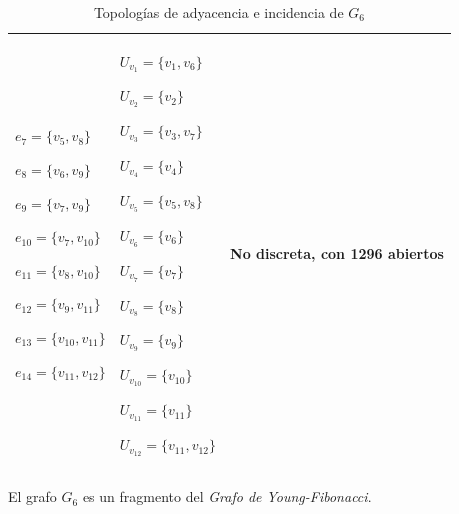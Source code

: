 \begin{table}[p]
\begin{tabular}{@{}>{\centering\arraybackslash}m{}>{\centering\arraybackslash}m{}>{\centering\arraybackslash}m{}@{}}
         ${e_{7}=\{v_5,v_8\}}$\par
         ${e_{8}=\{v_6,v_9\}}$\par
         ${e_{9}=\{v_7,v_9\}}$\par
         ${e_{10}=\{v_7,v_{10}\}}$\par
         ${e_{11}=\{v_8,v_{10}\}}$\par
         ${e_{12}=\{v_9,v_{11}\}}$\par
         ${e_{13}=\{v_{10},v_{11}\}}$\par
         ${e_{14}=\{v_{11},v_{12}\}}$
      &
         ${U_{v_1}=\{v_1,v_6\}}$\par
         ${U_{v_2}=\{v_2\}}$\par
         ${U_{v_3}=\{v_3,v_7\}}$\par
         ${U_{v_4}=\{v_4\}}$\par
         ${U_{v_5}=\{v_5,v_8\}}$\par
         ${U_{v_6}=\{v_6\}}$\par
         ${U_{v_7}=\{v_7\}}$\par
         ${U_{v_8}=\{v_8\}}$\par
         ${U_{v_9}=\{v_9\}}$\par
         ${U_{v_{10}}=\{v_{10}\}}$\par
         ${U_{v_{11}}=\{v_{11}\}}$\par
         ${U_{v_{12}}=\{v_{11},v_{12}\}}$
      &
         No discreta, con 1296 abiertos \\[6pt]
      \hline
   \end{tabular}
   \caption{Topologías de adyacencia e incidencia de $G_6$}
   \label{tab:topologias_G_6}

   \vspace{1em}
   \begin{minipage}{\textwidth}
      \normalsize
      El grafo $G_6$ es un fragmento del \textit{Grafo de Young-Fibonacci}.
   \end{minipage}
\end{table}
